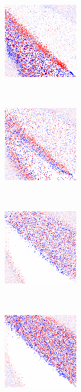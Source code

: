 \begin{figure}
\center

	\begin{subfigure}[t]{0.22\textwidth}
		\includegraphics[width=\stratgraphwidth]{images/findings/round1/diff/hand_max_min.png}
		\caption{\handmaxmin}
	\end{subfigure}
	~
	\begin{subfigure}[t]{0.22\textwidth}
		\includegraphics[width=\stratgraphwidth]{images/findings/round1/diff/hand_max_avg.png}
		\caption{\handmaxavg}
	\end{subfigure}
~
	\begin{subfigure}[t]{0.22\textwidth}
		\includegraphics[width=\stratgraphwidth]{images/findings/round1/diff/hand_max_med.png}
		\caption{\handmaxmed}
	\end{subfigure}
	~
	\begin{subfigure}[t]{0.22\textwidth}
		\includegraphics[width=\stratgraphwidth]{images/findings/round1/diff/hand_max_poss.png}
		\caption{\handmaxposs}
	\end{subfigure}


\end{figure}
